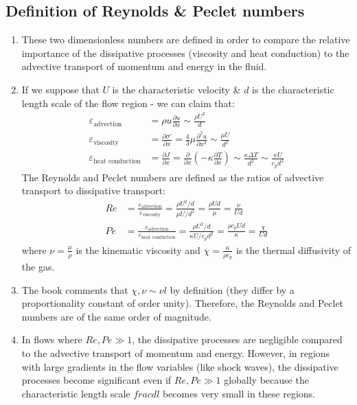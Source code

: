 ﻿\documentclass[11pt]{article}
\begin{document}
  \subsection{Definition of Reynolds \& Peclet numbers}
  \begin{enumerate}
    \item These two dimensionless numbers are defined in order to compare the relative importance of the dissipative processes (viscosity and heat conduction) to the advective transport of momentum and energy in the fluid.
    \item If we suppose that $U$ is the characteristic velocity \& $d$ is the characteristic length scale of the flow region - we can claim that:
    \begin{align}
      \varepsilon_{\text{advection}} &= \rho u \frac{\partial u}{\partial x} \sim \frac{\rho U^2}{d} \\
      \varepsilon_{\text{viscosity}} &= \frac{\partial\sigma'}{\partial x} = \frac{4}{3} \mu \frac{\partial^2 u}{\partial x^2} \sim \frac{\mu U}{d^2} \\
      \varepsilon_{\text{heat conduction}} &= \frac{\partial J}{\partial x} = \frac{\partial}{\partial x} \left( -\kappa \frac{\partial T}{\partial x} \right) \sim \frac{\kappa \Delta T}{d^2} \sim \frac{\kappa U}{c_p d^2}
    \end{align}
    The Reynolds and Peclet numbers are defined as the ratios of advective transport to dissipative transport:
    \begin{align}
      Re &= \frac{\varepsilon_{\text{advection}}}{\varepsilon_{\text{viscosity}}} = \frac{\rho U^2 / d}{\mu U / d^2} = \frac{\rho U d}{\mu} = \frac{\nu}{U d}\\
      Pe &= \frac{\varepsilon_{\text{advection}}}{\varepsilon_{\text{heat conduction}}} = \frac{\rho U^2 / d}{\kappa U / c_p d^2} = \frac{\rho c_p U d}{\kappa} = \frac{\chi}{U d}
    \end{align}
    where $\nu = \frac{\mu}{\rho}$ is the kinematic viscosity and $\chi = \frac{\kappa}{\rho c_p}$ is the thermal diffusivity of the gas.
    \item The book comments that $\chi,\nu\sim \nu l$ by definition (they differ by a proportionality constant of order unity). Therefore, the Reynolds and Peclet numbers are of the same order of magnitude. 
    \item In flows where $Re, Pe \gg 1$, the dissipative processes are negligible compared to the advective transport of momentum and energy. However, in regions with large gradients in the flow variables (like shock waves), the dissipative processes become significant even if $Re, Pe \gg 1$ globally because the characteristic length scale $
    frac{d}{l}$ becomes very small in these regions.
  \end{enumerate}
  
\end{document}
